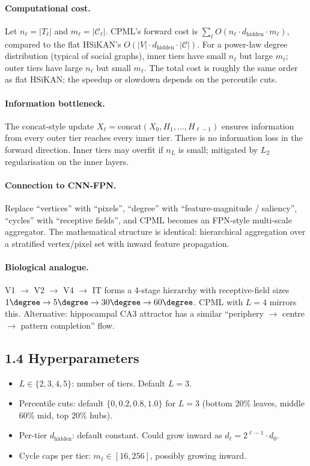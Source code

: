\documentclass[10pt]{article}
\begin{document}
\paragraph{Computational cost.} Let $n_\ell = |T_\ell|$ and
$m_\ell = |\mathcal{C}_\ell|$. CPML's forward cost is
$\sum_\ell O(n_\ell \cdot d_{\text{hidden}} \cdot m_\ell)$, compared to
the flat HSiKAN's $O(|V| \cdot d_{\text{hidden}} \cdot |\mathcal{C}|)$.
For a power-law degree distribution (typical of social graphs), inner
tiers have small $n_\ell$ but large $m_\ell$; outer tiers have large
$n_\ell$ but small $m_\ell$. The total cost is roughly the same
order as flat HSiKAN; the speedup or slowdown depends on the
percentile cuts.

\paragraph{Information bottleneck.} The concat-style update
$X_\ell = \mathrm{concat}(X_0, H_1, \ldots, H_{\ell-1})$ ensures
information from every outer tier reaches every inner tier. There is
no information loss in the forward direction. Inner tiers may
overfit if $n_L$ is small; mitigated by $L_2$ regularisation on the
inner layers.

\paragraph{Connection to CNN-FPN.} Replace ``vertices'' with
``pixels'', ``degree'' with ``feature-magnitude / saliency'',
``cycles'' with ``receptive fields'', and CPML becomes an FPN-style
multi-scale aggregator. The mathematical structure is identical:
hierarchical aggregation over a stratified vertex/pixel set with
inward feature propagation.

\paragraph{Biological analogue.} V1 $\to$ V2 $\to$ V4 $\to$ IT
forms a 4-stage hierarchy with receptive-field sizes
$1\degree \to 5\degree \to 30\degree \to 60\degree$. CPML with $L = 4$
mirrors this. Alternative: hippocampal CA3 attractor has a similar
``periphery $\to$ centre $\to$ pattern completion'' flow.

\subsection*{1.4 Hyperparameters}

\begin{itemize}
  \item $L \in \{2, 3, 4, 5\}$: number of tiers. Default $L = 3$.
  \item Percentile cuts: default $\{0, 0.2, 0.8, 1.0\}$ for $L = 3$
    (bottom 20\% leaves, middle 60\% mid, top 20\% hubs).
  \item Per-tier $d_{\text{hidden}}$: default constant. Could grow
    inward as $d_\ell = 2^{\ell-1} \cdot d_0$.
  \item Cycle caps per tier: $m_\ell \in [16, 256]$, possibly growing
    inward.
\end{itemize}
\end{document}

